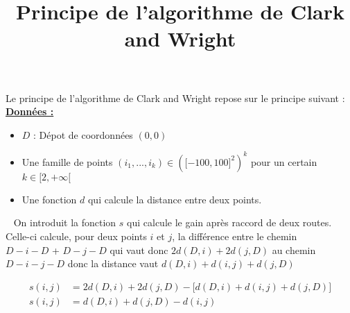 \documentclass[14pt]{article}
\title{Principe de l'algorithme de Clark and Wright}
\author{}
\date{}
\begin{document}
\maketitle

\pagebreak
\noindent Le principe de l'algorithme de Clark and Wright repose sur le principe suivant :
\\ \newline
\underline{\textbf{Données :}}
\begin{itemize}[label=•]
    \item $D$ : Dépot de coordonnées $(0,0)$
    \item Une famille de points \((i_1,...,i_k) \in {(\lbrack-100,100\rbrack^2)}^k\) pour un certain $k \in \lbrack2,+\infty\lbrack$
    \item Une fonction $d$ qui calcule la distance entre deux points.
\end{itemize}
\ \newline
On introduit la fonction $s$ qui calcule le gain après raccord de deux routes. Celle-ci calcule, pour deux points $i$ et $j$, la différence entre le chemin \\ $D-i-D$ + $D-j-D$ qui vaut donc $2d(D,i) + 2d(j,D)$ au chemin $D-i-j-D$ donc la distance vaut $d(D,i) + d(i,j) + d(j,D)$

\begin{align*}
    s(i,j) &= 2d(D,i) + 2d(j,D) - \lbrack d(D,i) + d(i,j) + d(j,D)\rbrack \\
    s(i,j) &= d(D,i) + d(j,D) - d(i,j)
\end{align*}
\end{document}
